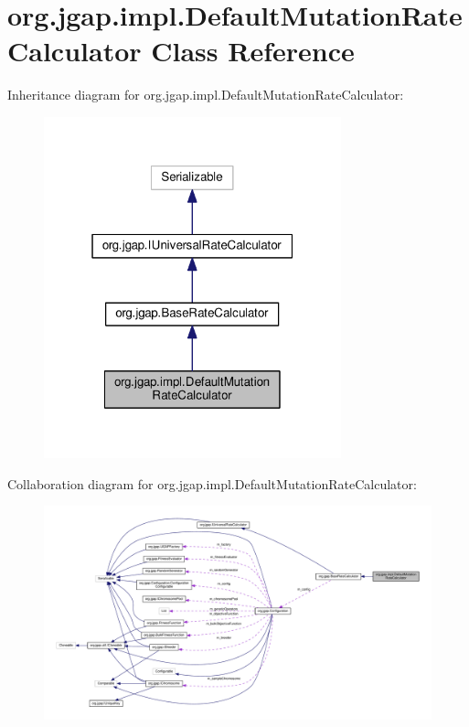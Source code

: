 \hypertarget{classorg_1_1jgap_1_1impl_1_1_default_mutation_rate_calculator}{\section{org.\-jgap.\-impl.\-Default\-Mutation\-Rate\-Calculator Class Reference}
\label{classorg_1_1jgap_1_1impl_1_1_default_mutation_rate_calculator}
}


Inheritance diagram for org.\-jgap.\-impl.\-Default\-Mutation\-Rate\-Calculator\-:
\nopagebreak
\begin{figure}[H]
\begin{center}
\leavevmode
\includegraphics[width=244pt]{classorg_1_1jgap_1_1impl_1_1_default_mutation_rate_calculator__inherit__graph}
\end{center}
\end{figure}


Collaboration diagram for org.\-jgap.\-impl.\-Default\-Mutation\-Rate\-Calculator\-:
\nopagebreak
\begin{figure}[H]
\begin{center}
\leavevmode
\includegraphics[width=350pt]{classorg_1_1jgap_1_1impl_1_1_default_mutation_rate_calculator__coll__graph}
\end{center}
\end{figure}
